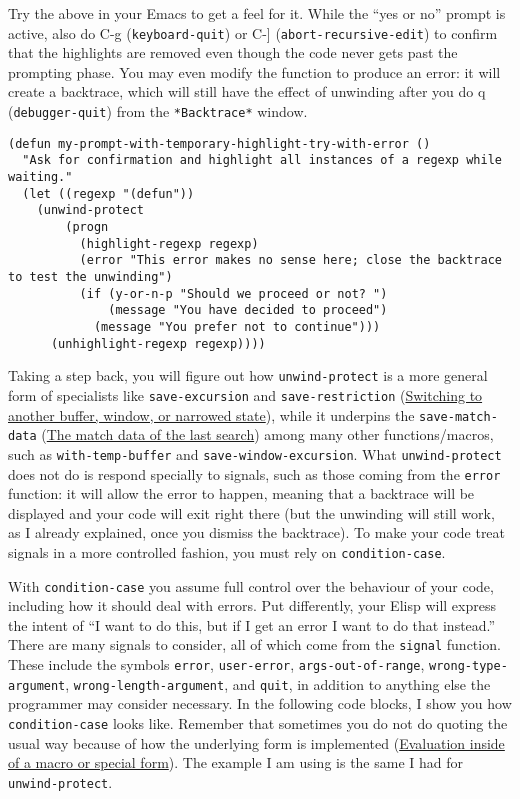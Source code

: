 \documentclass[11pt]{ctexart}
\begin{document}
Try the above in your Emacs to get a feel for it. While the ``yes or no'' prompt is active, also do C-g (\texttt{keyboard-quit}) or C-] (\texttt{abort-recursive-edit}) to confirm that the highlights are removed even though the code never gets past the prompting phase. You may even modify the function to produce an error: it will create a backtrace, which will still have the effect of unwinding after you do q (\texttt{debugger-quit}) from the \texttt{*Backtrace*} window.

\begin{verbatim}
(defun my-prompt-with-temporary-highlight-try-with-error ()
  "Ask for confirmation and highlight all instances of a regexp while waiting."
  (let ((regexp "(defun"))
    (unwind-protect
        (progn
          (highlight-regexp regexp)
          (error "This error makes no sense here; close the backtrace to test the unwinding")
          (if (y-or-n-p "Should we proceed or not? ")
              (message "You have decided to proceed")
            (message "You prefer not to continue")))
      (unhighlight-regexp regexp))))
\end{verbatim}

Taking a step back, you will figure out how \texttt{unwind-protect} is a more general form of specialists like \texttt{save-excursion} and \texttt{save-restriction} (\hyperref[sec:org518036f]{Switching to another buffer, window, or narrowed state}), while it underpins the \texttt{save-match-data} (\hyperref[sec:orge641c75]{The match data of the last search}) among many other functions/macros, such as \texttt{with-temp-buffer} and \texttt{save-window-excursion}. What \texttt{unwind-protect} does not do is respond specially to signals, such as those coming from the \texttt{error} function: it will allow the error to happen, meaning that a backtrace will be displayed and your code will exit right there (but the unwinding will still work, as I already explained, once you dismiss the backtrace). To make your code treat signals in a more controlled fashion, you must rely on \texttt{condition-case}.

With \texttt{condition-case} you assume full control over the behaviour of your code, including how it should deal with errors. Put differently, your Elisp will express the intent of ``I want to do this, but if I get an error I want to do that instead.'' There are many signals to consider, all of which come from the \texttt{signal} function. These include the symbols \texttt{error}, \texttt{user-error}, \texttt{args-out-of-range}, \texttt{wrong-type-argument}, \texttt{wrong-length-argument}, and \texttt{quit}, in addition to anything else the programmer may consider necessary. In the following code blocks, I show you how \texttt{condition-case} looks like. Remember that sometimes you do not do quoting the usual way because of how the underlying form is implemented (\hyperref[sec:org61e1a1b]{Evaluation inside of a macro or special form}). The example I am using is the same I had for \texttt{unwind-protect}.
\end{document}
